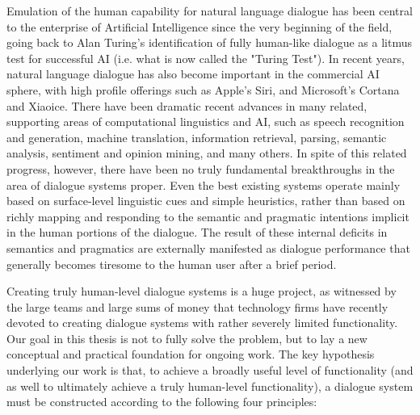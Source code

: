 \begin{englishabstract}

Emulation of the human capability for natural language dialogue has been central to the enterprise of Artificial Intelligence since the very beginning of the field, going back to Alan Turing's identification of fully human-like dialogue as a litmus test for successful AI (i.e. what is now called the "Turing Test").  In recent years, natural language dialogue has also become important in the commercial AI sphere, with high profile offerings such as Apple's Siri, and Microsoft's Cortana and Xiaoice.  There have been dramatic recent advances in many related, supporting areas of computational linguistics and AI, such as speech recognition and generation, machine translation, information retrieval, parsing, semantic analysis, sentiment and opinion mining, and many others.  In spite of this related progress, however, there have been no truly fundamental breakthroughs in the area of dialogue systems proper.  Even the best existing systems operate mainly based on surface-level linguistic cues and simple heuristics, rather than based on richly mapping and responding to the semantic and pragmatic intentions implicit in the human portions of the dialogue.  The result of these internal deficits in semantics and pragmatics are externally manifested as dialogue performance that generally becomes tiresome to the human user after a brief period. 

Creating truly human-level dialogue systems is a huge project, as witnessed by the large teams and large sums of money that technology firms have recently devoted to creating dialogue systems with rather severely limited functionality.   Our goal in this thesis is not to fully solve the problem, but to lay a new conceptual and practical foundation for ongoing work.  The key hypothesis underlying our work is that, to achieve a broadly useful level of functionality (and as well to ultimately achieve a truly human-level functionality), a dialogue system must be constructed according to the following four principles:


\end{englishabstract}
